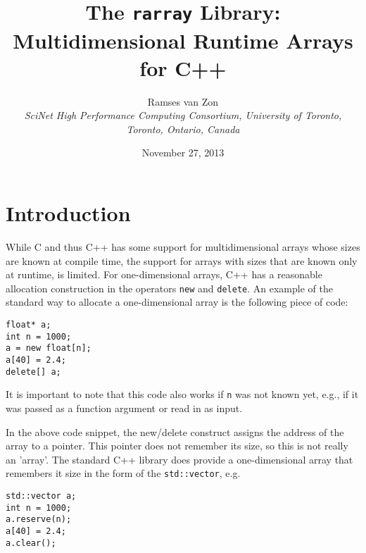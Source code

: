 \documentclass[12pt,twoside]{article}
\newcommand{\cxx}{C{++}}
\begin{document}
\setlength{\parskip}{1mm}

\title{The \texttt{rarray} Library:\\Multidimensional Runtime Arrays for \cxx}

\author{Ramses van Zon\\
\it\small SciNet High Performance Computing Consortium, University
of Toronto, Toronto, Ontario, Canada\vspace{-8pt}} 

\date{\small November 27, 2013\vspace{-5mm}}

\maketitle

\section{Introduction}

While C and thus C++ has some support for multidimensional arrays whose sizes are known at compile time, the support for arrays with sizes that are known only at runtime, is limited. For one-dimensional  arrays,  C++ has a reasonable allocation construction in the operators \texttt{new} and \texttt{delete}. An example of the standard way to allocate a one-dimensional array is the following piece of code:
\vspace{-5pt}\begin{framed}\vspace{-14pt}%
\begin{verbatim}
float* a;
int n = 1000;
a = new float[n];
a[40] = 2.4;
delete[] a;
\end{verbatim}%
\vspace{-12pt}\end{framed}\vspace{-5pt}%
It is important to note that this code also works if \texttt{n} was not known yet, e.g., if it was passed as a function argument or read in as input. 

In the above code snippet, the new/delete construct assigns the address of the array to a pointer. This pointer does not remember its size, so this is not really an 'array'.  The standard C++ library does provide a one-dimensional array that remembers it size in the form of the \texttt{std::vector}, e.g.
\vspace{-5pt}\begin{framed}\vspace{-14pt}%
\begin{verbatim}
std::vector a;
int n = 1000;
a.reserve(n);
a[40] = 2.4;
a.clear();
\end{verbatim}%
\vspace{-12pt}\end{framed}\vspace{-5pt}%
\end{document}
